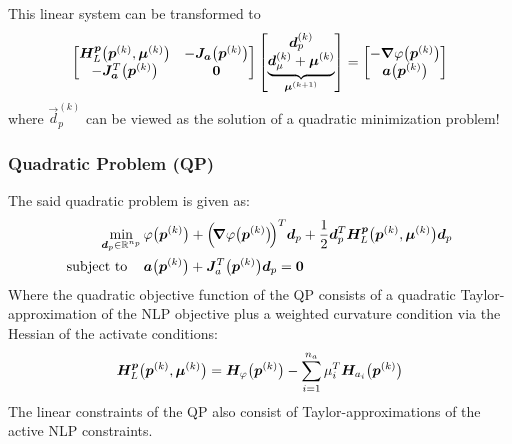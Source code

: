 			This linear system can be transformed to
			\begin{align*}
				\begin{bmatrix}
					\bm{H}_L^{\bm{p}}\big(\bm{p}^{(k)}, \bm{\mu}^{(k)}\big) & -\bm{J}_{\bm{a}}\big(\bm{p}^{(k)}\big) \\
					-\bm{J}_{\bm{a}}^T\big(\bm{p}^{(k)}\big) & \bm{0}
				\end{bmatrix}
				\begin{bmatrix}
					\bm{d}_p^{(k)} \\
					\underbrace{\bm{d}_\mu^{(k)} + \bm{\mu}^{(k)}}_{\bm{\mu}^{(k + 1)}}
				\end{bmatrix}
				=
				\begin{bmatrix}
					-\grad{\varphi}\big(\bm{p}^{(k)}\big) \\
					\bm{a}\big(\bm{p}^{(k)}\big)
				\end{bmatrix}
			\end{align*}
			where \( \vec{d}_p^{(k)} \) can be viewed as the solution of a quadratic minimization problem!

			\subsubsection{Quadratic Problem (QP)}
				The said quadratic problem is given as:
				\begin{align*}
					\min_{\bm{d}_p \in \mathbb{R}^{n_p}} &\, \varphi\big(\bm{p}^{(k)}\big) + \Big(\!\grad{\varphi}\big(\bm{p}^{(k)}\big)\!\Big)^T \bm{d}_p + \frac{1}{2} \bm{d}_p^T \bm{H}_L^{\bm{p}}\big(\bm{p}^{(k)}, \bm{\mu}^{(k)}\big) \bm{d}_p \\
					\mathrm{subject~to}\quad &\, \bm{a}\big(\bm{p}^{(k)}\big) + \bm{J}_a^T\big(\bm{p}^{(k)}\big) \bm{d}_p = \bm{0}
				\end{align*}
				Where the quadratic objective function of the QP consists of a quadratic Taylor-approximation of the NLP objective plus a weighted curvature condition via the Hessian of the activate conditions:
				\begin{align*}
					\bm{H}_L^{\bm{p}}\big(\bm{p}^{(k)}, \bm{\mu}^{(k)}\big) = \bm{H}_\varphi\big(\bm{p}^{(k)}\big) - \sum_{i = 1}^{n_a} \mu_i^T \bm{H}_{a_i}\big(\bm{p}^{(k)}\big)
				\end{align*}
				The linear constraints of the QP also consist of Taylor-approximations of the active NLP constraints.

